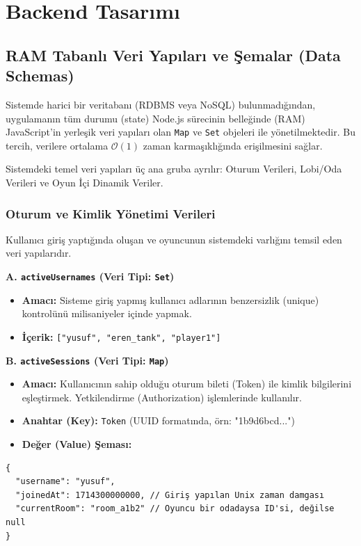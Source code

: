 \documentclass[12pt,a4paper]{article}
\begin{document}
\section{Backend Tasarımı}

\subsection{RAM Tabanlı Veri Yapıları ve Şemalar (Data Schemas)}

Sistemde harici bir veritabanı (RDBMS veya NoSQL) bulunmadığından, uygulamanın tüm durumu (state) Node.js
sürecinin belleğinde (RAM) JavaScript'in yerleşik veri yapıları olan \texttt{Map} ve \texttt{Set} objeleri
ile yönetilmektedir. Bu tercih, verilere ortalama $\mathcal{O}(1)$ zaman karmaşıklığında erişilmesini sağlar.

Sistemdeki temel veri yapıları üç ana gruba ayrılır: Oturum Verileri, Lobi/Oda Verileri ve Oyun İçi Dinamik Veriler.

\subsubsection{Oturum ve Kimlik Yönetimi Verileri}
Kullanıcı giriş yaptığında oluşan ve oyuncunun sistemdeki varlığını temsil eden veri yapılarıdır.

\textbf{A. \texttt{activeUsernames} (Veri Tipi: \texttt{Set})}
\begin{itemize}
      \item \textbf{Amacı:} Sisteme giriş yapmış kullanıcı adlarının benzersizlik (unique) kontrolünü milisaniyeler içinde yapmak.
      \item \textbf{İçerik:} \texttt{["yusuf", "eren\_tank", "player1"]}
\end{itemize}

\textbf{B. \texttt{activeSessions} (Veri Tipi: \texttt{Map})}
\begin{itemize}
      \item \textbf{Amacı:} Kullanıcının sahip olduğu oturum bileti (Token) ile kimlik bilgilerini eşleştirmek. Yetkilendirme (Authorization) işlemlerinde kullanılır.
      \item \textbf{Anahtar (Key):} \texttt{Token} (UUID formatında, örn: "1b9d6bcd...")
      \item \textbf{Değer (Value) Şeması:}
\end{itemize}
\begin{verbatim}
{
  "username": "yusuf",
  "joinedAt": 1714300000000, // Giriş yapılan Unix zaman damgası
  "currentRoom": "room_a1b2" // Oyuncu bir odadaysa ID'si, değilse null
}
\end{verbatim}
\end{document}
